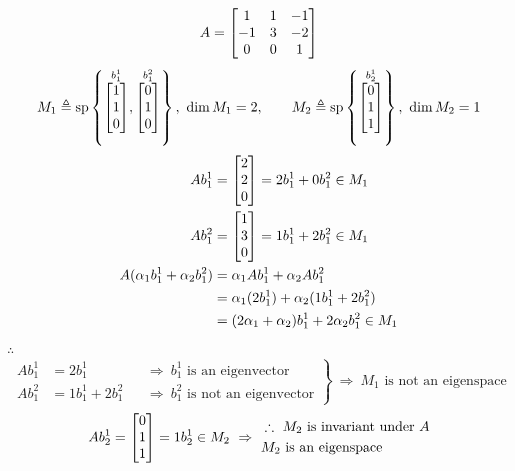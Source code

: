 \begin{example}
\[
A=\begin{bmatrix}1&1&-1\\-1&3&-2\\0&0&1\end{bmatrix}
\]
\[
M_1\triangleq\Span\left\{\overset{b_1^1}{\bmat{1\\1\\0}},\overset{b_1^2}{\bmat{0\\1\\0}}\right\},\ \dim M_1=2,
\qquad
M_2\triangleq\Span\left\{\overset{b_2^1}{\bmat{0\\1\\1}}\right\},\ \dim M_2=1
\]
\begin{align*}
Ab_1^1&=\begin{bmatrix}2\\2\\0\end{bmatrix}=2b_1^1+0b_1^2\in M_1\\
Ab_1^2&=\begin{bmatrix}1\\3\\0\end{bmatrix}=1b_1^1+2b_1^2\in M_1\\
A(\alpha_1b_1^1+\alpha_2b_1^2)&=\alpha_1Ab_1^1+\alpha_2Ab_1^2\\
&=\alpha_1(2b_1^1)+\alpha_2(1b_1^1+2b_1^2)\\
&=(2\alpha_1+\alpha_2)b_1^1+2\alpha_2b_1^2\in M_1
\end{align*}
$\therefore$ 
\[
\left.\begin{aligned}
Ab_1^1&=2b_1^1 &&\Rightarrow\ b_1^1\text{ is an eigenvector}\\
Ab_1^2&=1b_1^1+2b_1^2 &&\Rightarrow\ b_1^2\text{ is not an eigenvector}
\end{aligned}\right\}\ \Rightarrow\ M_1\text{ is not an eigenspace}
\]
\[
Ab_2^1=\bmat{0\\1\\1}=1b_2^1\in M_2\ \Rightarrow\
\begin{aligned}
&\therefore\ M_2\text{ is invariant under }A\\
&M_2\text{ is an eigenspace}
\end{aligned}
\]


\end{example}
